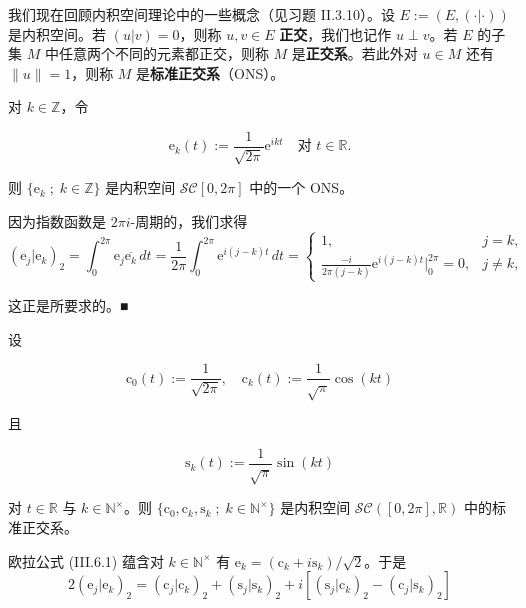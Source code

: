 我们现在回顾内积空间理论中的一些概念（见习题 II.3.10）。设 $ E := (E, (\cdot|\cdot)) $ 是内积空间。若 $ (u|v) = 0 $，则称 $ u, v \in E $ \textbf{正交}，我们也记作 $ u \perp v $。若 $ E $ 的子集 $ M $ 中任意两个不同的元素都正交，则称 $ M $ 是\textbf{正交系}。若此外对 $ u \in M $ 还有 $ \|u\| = 1 $，则称 $ M $ 是\textbf{标准正交系}（ONS）。

\begin{example}

\begin{items}
\item

对 $ k \in \mathbb{Z} $，令

\[
\mathrm{e}_{k}(t) := \frac{1}{\sqrt{2\pi}}\mathrm{e}^{ikt} \quad \text{对 } t \in \mathbb{R} .
\]

则 $ \{ \mathrm{e}_{k} \;;\; k \in \mathbb{Z} \} $ 是内积空间 $ \mathcal{SC}[0, 2\pi] $ 中的一个 ONS。

\proofhead
因为指数函数是 $ 2\pi i $-周期的，我们求得
\begin{equation*}
(\mathrm{e}_{j}|\mathrm{e}_{k})_{2} = \int_{0}^{2\pi} \mathrm{e}_{j}\overline{\mathrm{e}_{k}} \, dt = \frac{1}{2\pi}\int_{0}^{2\pi}\mathrm{e}^{i(j-k)t} \, dt = \begin{cases} 1 , & j = k , \\ \frac{-i}{2\pi(j-k)}\mathrm{e}^{i(j-k)t}\big|_{0}^{2\pi} = 0 , & j \ne k , \end{cases}
\end{equation*}

这正是所要求的。\nobreak\hspace{0.35em}■

\item

设

\[
\mathrm{c}_{0}(t) := \frac{1}{\sqrt{2\pi}} , \quad \mathrm{c}_{k}(t) := \frac{1}{\sqrt{\pi}}\cos(kt)
\]

且

\[
\mathrm{s}_{k}(t) := \frac{1}{\sqrt{\pi}}\sin(kt)
\]

对 $ t \in \mathbb{R} $ 与 $ k \in \mathbb{N}^{\times} $。则 $ \{ \mathrm{c}_{0}, \mathrm{c}_{k}, \mathrm{s}_{k} \;;\; k \in \mathbb{N}^{\times} \} $ 是内积空间 $ \mathcal{SC}([0, 2\pi], \mathbb{R}) $ 中的标准正交系。

\proofhead
欧拉公式 (III.6.1) 蕴含对 $ k \in \mathbb{N}^{\times} $ 有 $ \mathrm{e}_{k} = (\mathrm{c}_{k} + i\mathrm{s}_{k})/\sqrt{2} $。于是
\begin{equation}
2(\mathrm{e}_{j}|\mathrm{e}_{k})_{2} = (\mathrm{c}_{j}|\mathrm{c}_{k})_{2} + (\mathrm{s}_{j}|\mathrm{s}_{k})_{2} + i[(\mathrm{s}_{j}|\mathrm{c}_{k})_{2} - (\mathrm{c}_{j}|\mathrm{s}_{k})_{2}]\tag{7.3}
\end{equation}


\end{items}
\end{example}
